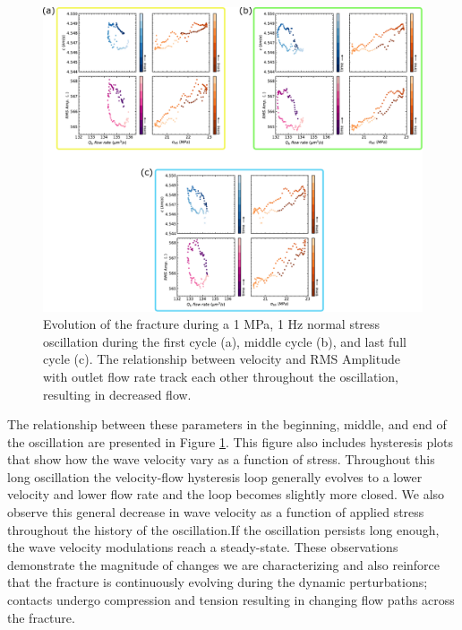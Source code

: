 \documentclass[letterpaper,10pt]{article}
\begin{document}
	\clearpage
	
	
	\begin{figure}[ht]
		\centering
		\includegraphics[width=0.9\columnwidth]{bowtie_p4975_run3b_01Hz_v3_portrait.pdf}
		\caption[]{Evolution of the fracture during a 1 MPa, 1 Hz normal stress oscillation during the first cycle (a), middle cycle (b), and last full cycle (c). The relationship between velocity and RMS Amplitude with outlet flow rate track each other throughout the oscillation, resulting in decreased flow.} %
		\label{fig:bowties}
	\end{figure}
	
	The relationship between these parameters in the beginning, middle, and end of the oscillation are presented in Figure \ref{fig:bowties}. This figure also includes hysteresis plots that show how the wave velocity vary as a function of stress. Throughout this long oscillation the velocity-flow hysteresis loop generally evolves to a lower velocity and lower flow rate and the loop becomes slightly more closed. We also observe this general decrease in wave velocity as a function of applied stress throughout the history of the oscillation.If the oscillation persists long enough, the wave velocity modulations reach a steady-state. These observations demonstrate the magnitude of changes we are characterizing and also reinforce that the fracture is continuously evolving during the dynamic perturbations; contacts undergo compression and tension resulting in changing flow paths across the fracture.
	
\end{document}
